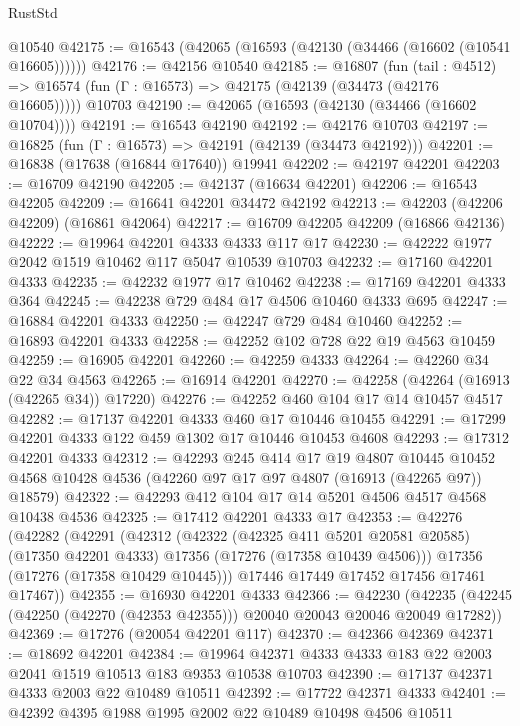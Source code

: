 \begin{lexlean}{RustStd}
\begin{coremodule}
    @10540
@42175 := @16543 (@42065 (@16593 (@42130 (@34466 (@16602 (@10541 @16605))))))
@42176 := @42156 @10540
@42185 := @16807
    (fun (tail : @4512) => @16574 (fun (Γ : @16573) => @42175 (@42139 (@34473 (@42176 @16605)))))
    @10703
@42190 := @42065 (@16593 (@42130 (@34466 (@16602 @10704))))
@42191 := @16543 @42190
@42192 := @42176 @10703
@42197 := @16825 (fun (Γ : @16573) => @42191 (@42139 (@34473 @42192)))
@42201 := @16838 (@17638 (@16844 @17640)) @19941
@42202 := @42197 @42201
@42203 := @16709 @42190
@42205 := @42137 (@16634 @42201)
@42206 := @16543 @42205
@42209 := @16641 @42201 @34472 @42192
@42213 := @42203 (@42206 @42209) (@16861 @42064)
@42217 := @16709 @42205 @42209 (@16866 @42136)
@42222 := @19964 @42201 @4333 @4333 @117 @17
@42230 := @42222 @1977 @2042 @1519 @10462 @117 @5047 @10539 @10703
@42232 := @17160 @42201 @4333
@42235 := @42232 @1977 @17 @10462
@42238 := @17169 @42201 @4333 @364
@42245 := @42238 @729 @484 @17 @4506 @10460 @4333 @695
@42247 := @16884 @42201 @4333
@42250 := @42247 @729 @484 @10460
@42252 := @16893 @42201 @4333
@42258 := @42252 @102 @728 @22 @19 @4563 @10459
@42259 := @16905 @42201
@42260 := @42259 @4333
@42264 := @42260 @34 @22 @34 @4563
@42265 := @16914 @42201
@42270 := @42258 (@42264 (@16913 (@42265 @34)) @17220)
@42276 := @42252 @460 @104 @17 @14 @10457 @4517
@42282 := @17137 @42201 @4333 @460 @17 @10446 @10455
@42291 := @17299 @42201 @4333 @122 @459 @1302 @17 @10446 @10453 @4608
@42293 := @17312 @42201 @4333
@42312 := @42293
    @245
    @414
    @17
    @19
    @4807
    @10445
    @10452
    @4568
    @10428
    @4536
    (@42260 @97 @17 @97 @4807 (@16913 (@42265 @97)) @18579)
@42322 := @42293 @412 @104 @17 @14 @5201 @4506 @4517 @4568 @10438 @4536
@42325 := @17412 @42201 @4333 @17
@42353 := @42276
    (@42282
      (@42291
        (@42312
          (@42322
            (@42325 @411 @5201 @20581 @20585)
            (@17350 @42201 @4333)
            @17356
            (@17276 (@17358 @10439 @4506)))
          @17356
          (@17276 (@17358 @10429 @10445)))
        @17446
        @17449
        @17452
        @17456
        @17461
        @17467))
@42355 := @16930 @42201 @4333
@42366 := @42230
    (@42235 (@42245 (@42250 (@42270 (@42353 @42355))) @20040 @20043 @20046 @20049 @17282))
@42369 := @17276 (@20054 @42201 @117)
@42370 := @42366 @42369
@42371 := @18692 @42201
@42384 := @19964 @42371 @4333 @4333 @183 @22 @2003 @2041 @1519 @10513 @183 @9353 @10538 @10703
@42390 := @17137 @42371 @4333 @2003 @22 @10489 @10511
@42392 := @17722 @42371 @4333
@42401 := @42392 @4395 @1988 @1995 @2002 @22 @10489 @10498 @4506 @10511

\end{coremodule}
\end{lexlean}
